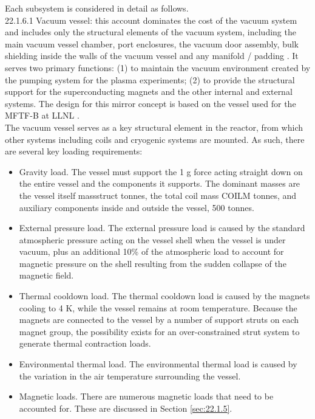 Each subsystem is considered in detail as follows. \\

22.1.6.1 Vacuum vessel: this account dominates the cost of the vacuum system and includes only the structural elements of the vacuum system, including the main vacuum vessel chamber, port enclosures, the vacuum door assembly, bulk shielding inside the walls of the vacuum vessel and any manifold / padding \cite{waganer2006design}. It serves two primary functions: (1) to maintain the vacuum environment created by the pumping system for the plasma experiments; (2) to provide the structural support for the superconducting magnets and the other internal and external systems. The design for this mirror concept is based on the vessel used for the MFTF-B at LLNL \cite{gerich1986design} . \\

The vacuum vessel serves as a  key structural element in the reactor, from which other systems including coils and cryogenic systems are mounted.  As such, there are several key loading requirements:

\begin{itemize}
    \item Gravity load. The vessel must support the 1 g force acting straight down on the entire vessel and the components it supports. The dominant masses are the vessel itself massstruct tonnes, the total coil mass COILM tonnes, and auxiliary components inside and outside the vessel, 500 tonnes.

    \item External pressure load. The external pressure load is caused by the standard atmospheric pressure acting on the vessel shell when the vessel is under vacuum, plus an additional 10\% of the atmospheric load to account for magnetic  pressure on the shell resulting from the sudden collapse of the magnetic field.

    \item Thermal cooldown load. The thermal cooldown load is  caused by the magnets cooling to 4 K, while the vessel remains at room temperature. Because the magnets are connected to the vessel by a number of support struts on each  magnet group, the possibility exists for an over-constrained  strut system to generate thermal contraction loads.

    \item Environmental thermal load. The environmental thermal load is caused by the variation in the air temperature surrounding the vessel.

    \item Magnetic loads. There are numerous magnetic loads that need to be accounted for. These are discussed in Section \ref{sec:22.1.5}.
\end{itemize}


